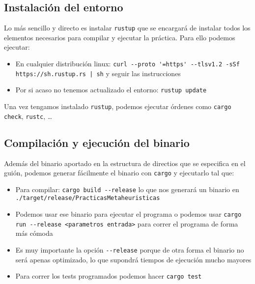 \documentclass[11pt]{article}
\begin{document}
\subsection{Instalación del entorno}

Lo más sencillo y directo es instalar \lstinline{rustup} \footnotemark que se encargará de instalar todos los elementos necesarios para compilar y ejecutar la práctica. Para ello podemos ejecutar:

\begin{itemize}
    \item En cualquier distribución linux: \lstinline{curl --proto '=https' --tlsv1.2 -sSf https://sh.rustup.rs | sh} y seguir las instrucciones
    \item Por si acaso no tenemos actualizado el entorno: \lstinline{rustup update}
\end{itemize}

Una vez tengamos instalado \lstinline{rustup}, podemos ejecutar órdenes como \lstinline{cargo check}, \lstinline{rustc}, \ldots


\subsection{Compilación y ejecución del binario}

Además del binario aportado en la estructura de directios que se especifica en el guión, podemos generar fácilmente el binario con \lstinline{cargo} y ejecutarlo tal que:

\begin{itemize}
    \item Para compilar: \lstinline{cargo build --release} lo que nos generará un binario en \lstinline{./target/release/PracticasMetaheuristicas}
    \item Podemos usar ese binario para ejecutar el programa o podemos usar \lstinline{cargo run --release <parametros entrada>} para correr el programa de forma más cómoda
    \item Es muy importante la opción \lstinline{--release} porque de otra forma el binario no será apenas optimizado, lo que supondrá tiempos de ejecución mucho mayores
    \item Para correr los tests programados podemos hacer \lstinline{cargo test}
\end{itemize}
\end{document}
